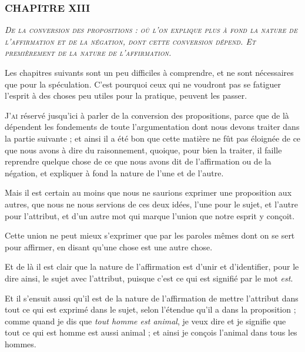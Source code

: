 \subsubsection{\centering \Large CHAPITRE XIII}
\begin{center}\emph{\large\scshape De la conversion des propositions : où l'on explique plus à fond la nature de l'affirmation et de la négation, dont cette conversion dépend. Et premièrement de la nature de l'affirmation.}\end{center}


	\begin{center}{\footnotesize Les chapitres suivants sont un peu difficiles à comprendre, et ne sont nécessaires que pour la spéculation. C'est pourquoi ceux qui ne voudront pas se fatiguer l'esprit à des choses peu utiles pour la pratique, peuvent les passer.}\end{center}

		\lettrine{J}{'ai} réservé jusqu'ici à parler de la conversion des propositions, parce que de là dépendent les fondements de toute l'argumentation dont nous devons traiter dans la partie suivante ; et ainsi il a été bon que cette matière ne fût pas éloignée de ce que nous avons à dire du raisonnement, quoique, pour bien la traiter, il faille reprendre quelque chose de ce que nous avons dit de l'affirmation ou de la négation, et expliquer à fond la nature de l'une et de l'autre.

Mais il est certain au moins que nous ne saurions exprimer une proposition aux autres, que nous ne nous servions de ces deux idées, l'une pour le sujet, et l'autre pour l'attribut, et d'un autre mot qui marque l'union que notre esprit y conçoit.

Cette union ne peut mieux s'exprimer que par les paroles mêmes dont on se sert pour affirmer, en disant qu'une chose est une autre chose.

Et de là il est clair que la nature de l'affirmation est d'unir et d'identifier, pour le dire ainsi, le sujet avec l'attribut, puisque c'est ce qui est signifié par le mot \emph{est}.

Et il s'ensuit aussi qu'il est de la nature de l'affirmation de mettre l'attribut dans tout ce qui est exprimé dans le sujet, selon l'étendue qu'il a dans la proposition ; comme quand je dis que \emph{tout homme est animal}, je veux dire et je signifie que tout ce qui est homme est aussi animal ; et ainsi je conçois l'animal dans tous les hommes.

